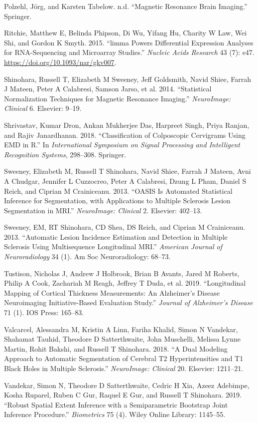 \documentclass[]{elsarticle} %
\begin{document}
\leavevmode\hypertarget{ref-polzehlmagnetic}{}%
Polzehl, Jörg, and Karsten Tabelow. n.d. ``Magnetic Resonance Brain Imaging.'' Springer.

\leavevmode\hypertarget{ref-limma}{}%
Ritchie, Matthew E, Belinda Phipson, Di Wu, Yifang Hu, Charity W Law, Wei Shi, and Gordon K Smyth. 2015. ``limma Powers Differential Expression Analyses for RNA-Sequencing and Microarray Studies.'' \emph{Nucleic Acids Research} 43 (7): e47. \url{https://doi.org/10.1093/nar/gkv007}.

\leavevmode\hypertarget{ref-shinohara2014statistical}{}%
Shinohara, Russell T, Elizabeth M Sweeney, Jeff Goldsmith, Navid Shiee, Farrah J Mateen, Peter A Calabresi, Samson Jarso, et al. 2014. ``Statistical Normalization Techniques for Magnetic Resonance Imaging.'' \emph{NeuroImage: Clinical} 6. Elsevier: 9--19.

\leavevmode\hypertarget{ref-shrivastav2018classification}{}%
Shrivastav, Kumar Dron, Ankan Mukherjee Das, Harpreet Singh, Priya Ranjan, and Rajiv Janardhanan. 2018. ``Classification of Colposcopic Cervigrams Using EMD in R.'' In \emph{International Symposium on Signal Processing and Intelligent Recognition Systems}, 298--308. Springer.

\leavevmode\hypertarget{ref-sweeney2013oasis}{}%
Sweeney, Elizabeth M, Russell T Shinohara, Navid Shiee, Farrah J Mateen, Avni A Chudgar, Jennifer L Cuzzocreo, Peter A Calabresi, Dzung L Pham, Daniel S Reich, and Ciprian M Crainiceanu. 2013. ``OASIS Is Automated Statistical Inference for Segmentation, with Applications to Multiple Sclerosis Lesion Segmentation in MRI.'' \emph{NeuroImage: Clinical} 2. Elsevier: 402--13.

\leavevmode\hypertarget{ref-sweeney2013automatic}{}%
Sweeney, EM, RT Shinohara, CD Shea, DS Reich, and Ciprian M Crainiceanu. 2013. ``Automatic Lesion Incidence Estimation and Detection in Multiple Sclerosis Using Multisequence Longitudinal MRI.'' \emph{American Journal of Neuroradiology} 34 (1). Am Soc Neuroradiology: 68--73.

\leavevmode\hypertarget{ref-tustison2019longitudinal}{}%
Tustison, Nicholas J, Andrew J Holbrook, Brian B Avants, Jared M Roberts, Philip A Cook, Zachariah M Reagh, Jeffrey T Duda, et al. 2019. ``Longitudinal Mapping of Cortical Thickness Measurements: An Alzheimer's Disease Neuroimaging Initiative-Based Evaluation Study.'' \emph{Journal of Alzheimer's Disease} 71 (1). IOS Press: 165--83.

\leavevmode\hypertarget{ref-valcarcel2018dual}{}%
Valcarcel, Alessandra M, Kristin A Linn, Fariha Khalid, Simon N Vandekar, Shahamat Tauhid, Theodore D Satterthwaite, John Muschelli, Melissa Lynne Martin, Rohit Bakshi, and Russell T Shinohara. 2018. ``A Dual Modeling Approach to Automatic Segmentation of Cerebral T2 Hyperintensities and T1 Black Holes in Multiple Sclerosis.'' \emph{NeuroImage: Clinical} 20. Elsevier: 1211--21.

\leavevmode\hypertarget{ref-vandekar2019robust}{}%
Vandekar, Simon N, Theodore D Satterthwaite, Cedric H Xia, Azeez Adebimpe, Kosha Ruparel, Ruben C Gur, Raquel E Gur, and Russell T Shinohara. 2019. ``Robust Spatial Extent Inference with a Semiparametric Bootstrap Joint Inference Procedure.'' \emph{Biometrics} 75 (4). Wiley Online Library: 1145--55.
\end{document}
